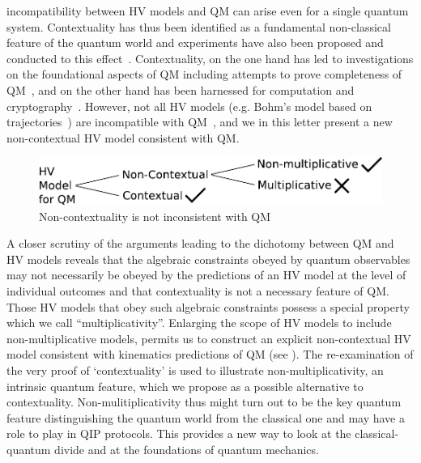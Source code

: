 \documentclass[british,aps,prl,superscriptaddress,nofootinbib,times,reprint]{revtex4-1}
\theoremstyle{plain}
\theoremstyle{plain}
\theoremstyle{definition}
\theoremstyle{remark}
\theoremstyle{remark}
\theoremstyle{remark}
\theoremstyle{plain}
\theoremstyle{plain}
\theoremstyle{plain}
\theoremstyle{definition}
\theoremstyle{definition}
\begin{document}
incompatibility between HV models and QM can arise
even for a single quantum system.  Contextuality
has thus been identified as a fundamental
non-classical feature of the quantum world and
experiments have also been proposed and conducted
to this effect~\cite{SimonContExpProp,
HuangContExp}.
Contextuality, on the one hand has
led to investigations on the foundational aspects
of QM including attempts to prove completeness of
QM~\cite{PawelCntxClsscl,CabelloMmryQM}, and on
the other hand has been harnessed for computation
and
cryptography~\cite{HowardCntxCmptn,CabelloCntxScrt}.
However, not all HV models (e.g.
Bohm's model based on
trajectories~\cite{Bohm1,Bohm2}) are incompatible
with QM~\cite{BellOnHiddenVariables}, and we in
this letter present a new non-contextual HV model
consistent with QM.
\begin{figure}[h]
\includegraphics[width=0.9\columnwidth]{block1}
\caption{Non-contextuality is not inconsistent
with QM} \label{fig:block}\end{figure}
A closer scrutiny of the arguments
leading to the dichotomy between QM and HV models
reveals that the algebraic constraints obeyed by
quantum observables may not necessarily be obeyed
by the predictions of an HV model at the level of
individual outcomes and  that contextuality is 
not a necessary feature of QM.  Those HV
models that obey such algebraic constraints
possess a special property which we call
``multiplicativity''.  Enlarging the scope of HV
models to include non-multiplicative models,
permits us to construct an explicit non-contextual
HV model consistent with 
{\color{red} kinematics predictions of}
QM (see ).
The re-examination of the very proof of
`contextuality'  is used to illustrate
non-multiplicativity, an intrinsic quantum
feature, which we propose as a possible
alternative to contextuality. 
Non-mulitiplicativity thus might turn out to be
the key quantum feature distinguishing the quantum
world from the classical one and may have a role
to play in QIP protocols.  This provides a new
way to look at the classical-quantum divide and at
the foundations of quantum mechanics. 
\end{document}
